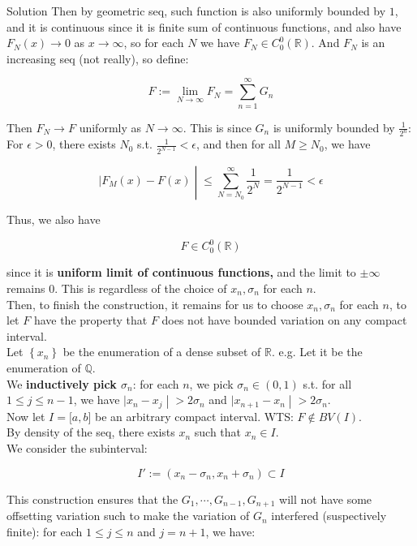 \documentclass{qlnotes-export}
\begin{document}
\begin{qlsolution}{Solution}
Then by geometric seq, such function is also uniformly bounded by \(1\), and it is continuous since it is finite sum of continuous functions, and also have \(F_{N}(x)\rightarrow 0\) as \(x\rightarrow\infty\), so for each \(N\) we have \(F_{N} \in C_{0}^{0}({\mathbb{R}})\). And \(F_{N}\) is an increasing seq (not really), so define:

\[F := \lim\limits_{N\rightarrow\infty}F_{N} = \sum\limits_{n = 1}^{\infty}G_{n}\]

Then \(F_{N}\rightarrow F\) uniformly as \(N\rightarrow\infty\). This is since \(G_{n}\) is uniformly bounded by \(\frac{1}{2^{n}}\): For \(\epsilon > 0\), there exists \(N_{0}\) s.t. \(\frac{1}{2^{N - 1}} < \epsilon\), and then for all \(M \geq N_{0}\), we have

\[\left. |F_{M}(x) - F(x) \middle| \leq \sum\limits_{N = N_{0}}^{\infty}\frac{1}{2^{N}} = \frac{1}{2^{N - 1}} < \epsilon \right.\]

Thus, we also have

\[F \in C_{0}^{0}({\mathbb{R}})\]

since it is \textbf{uniform limit of continuous functions,} and the limit to \(\pm \infty\) remains \(0\). This is regardless of the choice of \(x_{n},\sigma_{n}\) for each \(n\).\\
Then, to finish the construction, it remains for us to choose \(x_{n},\sigma_{n}\) for each \(n\), to let \(F\) have the property that \(F\) does not have bounded variation on any compact interval.\\
Let \(\left\{ x_{n} \right\}\) be the enumeration of a dense subset of \(\mathbb{R}\). e.g. Let it be the enumeration of \(\mathbb{Q}\).\\
We \textbf{inductively pick \(\sigma_{n}\)}: for each \(n\), we pick \(\sigma_{n} \in (0,1)\) s.t. for all \(1 \leq j \leq n - 1\), we have \(\left. |x_{n} - x_{j} \middle| > 2\sigma_{n} \right.\) and \(\left. |x_{n + 1} - x_{n} \middle| > 2\sigma_{n} \right.\).\\
Now let \(I = \lbrack a,b\rbrack\) be an arbitrary compact interval. WTS: \(F \notin BV(I)\).\\
By density of the seq, there exists \(x_{n}\) such that \(x_{n} \in I\).\\
We consider the subinterval:

\[I' := (x_{n} - \sigma_{n},x_{n} + \sigma_{n}) \subset I\]

This construction ensures that the \(G_{1},\cdots,G_{n - 1},G_{n + 1}\) will not have some offsetting variation such to make the variation of \(G_{n}\) interfered (suspectively finite): for each \(1 \leq j \leq n\) and \(j = n + 1\), we have:


\end{qlsolution}
\end{document}
